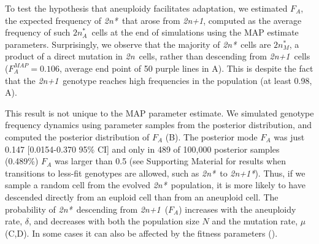 \documentclass[12pt]{extarticle}
\newcommand{\euwt}{\emph{2n}}
\newcommand{\anwt}{\emph{2n+1}}
\newcommand{\eumt}{\emph{2n*}}
\newcommand{\eumtM}{\emph{$2n^*_M$}}
\newcommand{\eumtA}{\emph{$2n^*_A$}}
\newcommand{\anmt}{\emph{2n+1*}}
\begin{document}
To test the hypothesis that aneuploidy facilitates adaptation, we estimated $F_A$, the expected frequency of \eumt\ that arose from \anwt, computed as the average frequency of such \eumtA\ cells at the end of simulations using the MAP estimate parameters.
Surprisingly, we observe that the majority of \eumt\ cells are \eumtM, a product of a direct mutation in \euwt\ cells, rather than descending from \anwt\ cells ($F_A^{MAP} = 0.106$, average end point of 50 purple lines in A). 
This is despite the fact that the \anwt\ genotype reaches high frequencies in the population (at least 0.98, A).

This result is not unique to the MAP parameter estimate. 
We simulated genotype frequency dynamics using parameter samples from the posterior distribution, and computed the posterior distribution of $F_A$ (B). 
The posterior mode $F_A$ was just 0.147 [0.0154-0.370 95\% CI] and only in 489 of 100,000 posterior samples (0.489\%) $F_A$ was  larger than 0.5 (see Supporting Material for results when transitions to less-fit genotypes are allowed, such as \eumt\ to \anmt).  
Thus, if we sample a random cell from the evolved \eumt\ population, it is more likely to have descended directly from an euploid cell than from an aneuploid cell.
The probability of \eumt\ descending from \anwt\ ($F_A$) increases with the aneuploidy rate, $\delta$, and decreases with both the population size $N$ and the mutation rate, $\mu$ (C,D). In some cases it can also be affected by the fitness parameters ().


\end{document}
